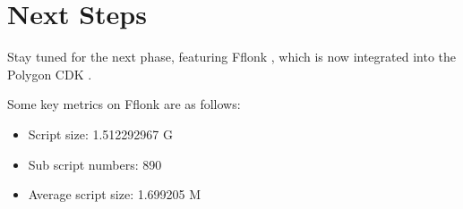\section{Next Steps}

Stay tuned for the next phase, featuring Fflonk \cite{website:Fflonk}, which is now integrated into the Polygon CDK \cite{website:Polygon-CDK}.

Some key metrics on Fflonk are as follows: 
\begin{itemize}
    \item Script size: 1.512292967 G
    \item Sub script numbers: 890
    \item Average script size: 1.699205 M
\end{itemize}
    
